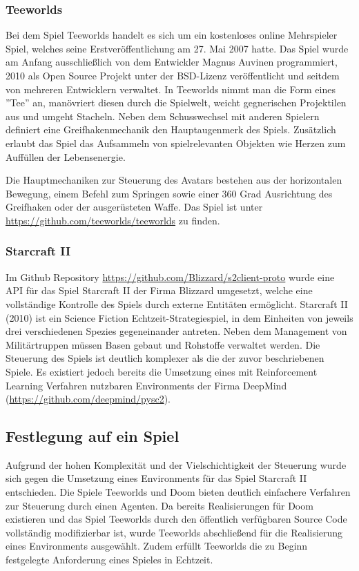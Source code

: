 \documentclass[11pt]{scrartcl}
\begin{document}
\subsubsection{Teeworlds}
Bei dem Spiel Teeworlds handelt es sich um ein kostenloses online Mehrspieler Spiel, welches seine
Erstveröffentlichung am 27. Mai 2007 hatte. Das Spiel wurde am Anfang ausschließlich von dem
Entwickler Magnus Auvinen programmiert, 2010 als Open Source Projekt unter der BSD-Lizenz
veröffentlicht und seitdem von mehreren Entwicklern verwaltet. In Teeworlds nimmt man die Form
eines ''Tee'' an, manövriert diesen durch die Spielwelt, weicht gegnerischen Projektilen aus und
umgeht Stacheln. Neben dem Schusswechsel mit anderen Spielern definiert eine Greifhakenmechanik den
Hauptaugenmerk des Spiels. Zusätzlich erlaubt das Spiel das Aufsammeln von spielrelevanten Objekten
wie Herzen zum Auffüllen der Lebensenergie.

Die Hauptmechaniken zur Steuerung des Avatars bestehen aus der horizontalen Bewegung, einem Befehl
zum Springen sowie einer 360 Grad Ausrichtung des Greifhaken oder der ausgerüsteten Waffe.
Das Spiel ist unter \url{https://github.com/teeworlds/teeworlds} zu finden.

\subsubsection{Starcraft II}
Im Github Repository \url{https://github.com/Blizzard/s2client-proto} wurde eine API für das Spiel
Starcraft II der Firma Blizzard umgesetzt, welche eine vollständige Kontrolle des Spiels durch
externe Entitäten ermöglicht. Starcraft II (2010) ist ein Science Fiction Echtzeit-Strategiespiel,
in dem Einheiten von jeweils drei verschiedenen Spezies gegeneinander antreten. Neben dem
Management von Militärtruppen müssen Basen gebaut und Rohstoffe verwaltet werden. Die Steuerung
des Spiels ist deutlich komplexer als die der zuvor beschriebenen Spiele. Es existiert jedoch
bereits die Umsetzung eines mit Reinforcement Learning Verfahren nutzbaren Environments der Firma
DeepMind (\url{https://github.com/deepmind/pysc2}). 

\subsection{Festlegung auf ein Spiel}
Aufgrund der hohen Komplexität und der Vielschichtigkeit der Steuerung wurde sich gegen die Umsetzung
eines Environments für das Spiel Starcraft II entschieden. Die Spiele Teeworlds und Doom bieten
deutlich einfachere Verfahren zur Steuerung durch einen Agenten. Da bereits Realisierungen für Doom
existieren und das Spiel Teeworlds durch den öffentlich verfügbaren Source Code vollständig modifizierbar
ist, wurde Teeworlds abschließend für die Realisierung eines Environments ausgewählt. Zudem erfüllt
Teeworlds die zu Beginn festgelegte Anforderung eines Spieles in Echtzeit.
\end{document}
